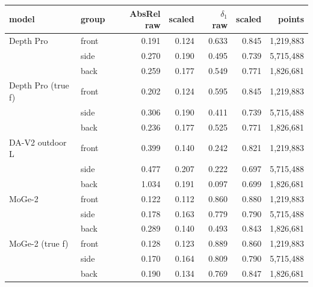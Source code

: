 \footnotesize\renewcommand{\arraystretch}{0.92}
\begin{tabular}{llrrrrr}
\toprule
model & group & AbsRel raw & scaled & $\delta_1$ raw & scaled & points \\
\midrule
Depth Pro & front & 0.191 & 0.124 & 0.633 & 0.845 & 1,219,883 \\
 & side & 0.270 & 0.190 & 0.495 & 0.739 & 5,715,488 \\
 & back & 0.259 & 0.177 & 0.549 & 0.771 & 1,826,681 \\
Depth Pro (true f) & front & 0.202 & 0.124 & 0.595 & 0.845 & 1,219,883 \\
 & side & 0.306 & 0.190 & 0.411 & 0.739 & 5,715,488 \\
 & back & 0.236 & 0.177 & 0.525 & 0.771 & 1,826,681 \\
DA-V2 outdoor L & front & 0.399 & 0.140 & 0.242 & 0.821 & 1,219,883 \\
 & side & 0.477 & 0.207 & 0.222 & 0.697 & 5,715,488 \\
 & back & 1.034 & 0.191 & 0.097 & 0.699 & 1,826,681 \\
MoGe-2 & front & 0.122 & 0.112 & 0.860 & 0.880 & 1,219,883 \\
 & side & 0.178 & 0.163 & 0.779 & 0.790 & 5,715,488 \\
 & back & 0.289 & 0.140 & 0.493 & 0.843 & 1,826,681 \\
MoGe-2 (true f) & front & 0.128 & 0.123 & 0.889 & 0.860 & 1,219,883 \\
 & side & 0.170 & 0.164 & 0.809 & 0.790 & 5,715,488 \\
 & back & 0.190 & 0.134 & 0.769 & 0.847 & 1,826,681 \\
\bottomrule
\end{tabular}
